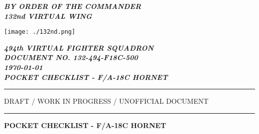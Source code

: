 \begin{titlepage}
	\begin{center}

        \begin{flushleft}
          \small
          \textbf{\textit{BY ORDER OF THE COMMANDER\\132nd VIRTUAL WING\\}}
        \end{flushleft}

        \begin{flushleft}
        	\texttt{[image: ./132nd.png]}
        \end{flushleft}
        
        \vspace*{-5.6cm}
        
        \begin{flushright}
          \small
          \textbf{\textit{494th VIRTUAL FIGHTER SQUADRON}}\\
          \textbf{\textit{DOCUMENT NO. 132-494-F18C-500}}\\
          \vspace*{2.6cm}
          \textbf{\textit{\today}}\\
          \textbf{\textit{POCKET CHECKLIST - F/A-18C HORNET}}\\
        \end{flushright}
        
        \vspace*{0.35cm}
        
        \hrule
       	    
        \vspace{.5cm}
        
        \begin{center}
          \small
          \large{
            DRAFT / WORK IN PROGRESS / UNOFFICIAL DOCUMENT
          }        
        \end{center}

        \vspace{.5cm}

        \hrule

        \vspace{1.5cm}

        \begin{center}
          \small
          \LARGE{
            \textbf{POCKET CHECKLIST - F/A-18C HORNET}
          }
        \end{center}


\end{center}
\end{titlepage}

